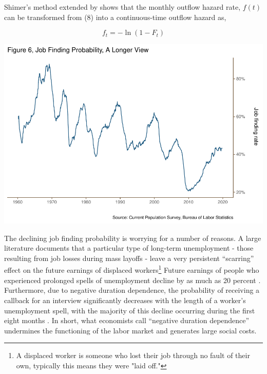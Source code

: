 \documentclass[
  11pt,
]{article}
\begin{document}
Shimer's method extended by \cite{elsby13} shows that the monthly
outflow hazard rate, \(f(t)\) can be transformed from (8) into a
continuous-time outflow hazard as,

\begin{equation}
f_{t} = - \ln(1 - F_{t})
\end{equation}

\begin{center}\includegraphics{JOLTS_files/figure-latex/unnamed-chunk-10-1} \end{center}

The declining job finding probability is worrying for a number of
reasons. A large literature documents that a particular type of
long-term unemployment - those resulting from job losses during mass
layoffs - leave a very persistent ``scarring'' effect on the future
earnings of displaced
workers\footnote{A displaced worker is someone who lost their job through no fault of their own, typically this means they were "laid off."}
Future earnings of people who experienced prolonged spells of
unemployment decline by as much as 20 percent \cite{davis10}.
Furthermore, due to negative duration dependence, the probability of
receiving a callback for an interview significantly decreases with the
length of a worker's unemployment spell, with the majority of this
decline occurring during the first eight months \cite{kroft13}. In
short, what economists call ``negative duration dependence'' undermines
the functioning of the labor market and generates large social costs.
\end{document}

